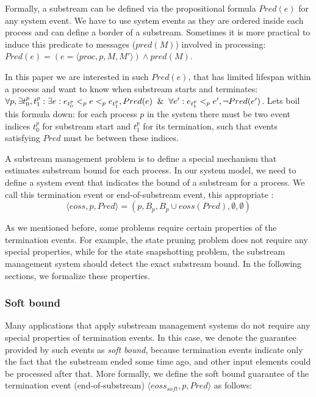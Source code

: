 Formally, a substream can be defined via the propositional formula $Pred(e)$ for any system event. We have to use system events as they are ordered inside each process and can define a border of a substream. Sometimes it is more practical to induce this predicate to messages ($pred(M)$) involved in processing: $Pred(e) = (e = \langle proc, p, M, M'\rangle) \wedge pred(M)$.

In this paper we are interested in such $Pred(e)$, that has limited lifespan within a process and want to know when substream starts and terminates: $\forall p, \exists t_0^p, t_1^p: \exists e: e_{t_0^p} <_p e <_p e_{t_1^p}, Pred(e) \And \forall e': e_{t_1^p} <_p e', \neg Pred(e')$. Lets boil this formula down: for each process $p$ in the system there must be two event indices $t_0^p$ for substream start and $t_1^p$ for its termination, such that events satisfying $Pred$ must be between these indices. 

A substream management problem is to define a special mechanism that estimates substream bound for each process. In our system model, we need to define a system event that indicates the bound of a substream for a process. We call this termination event or end-of-substream event, this appropriate :
\begin{equation}
  \langle eoss, p, Pred \rangle = (p, B_p, B_p\cup eoss(Pred), \emptyset, \emptyset)  
\end{equation}

As we mentioned before, some problems require certain properties of the termination events. For example, the state pruning problem does not require any special properties, while for the state snapshotting problem, the substream management system should detect the exact substream bound. In the following sections, we formalize these properties. 

\subsubsection{Soft bound}

Many applications that apply substream management systems do not require any special properties of termination events. In this case, we denote the guarantee provided by such events as {\em soft bound}, because termination events indicate only the fact that the substream ended some time ago, and other input elements could be processed after that. More formally, we define the soft bound guarantee of the termination event (end-of-substream) $\langle eoss_{soft}, p, Pred\rangle$ as follows:


